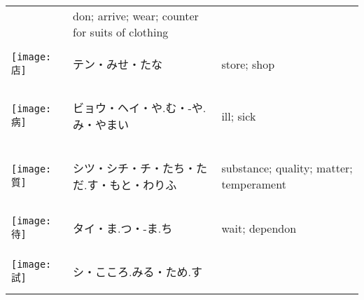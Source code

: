 \documentclass[a4paper,12pt]{extarticle}
\begin{document}
\begin{longtable}{|lp{6cm}p{4cm}|}
&
don; arrive; wear; counter for suits of clothing
\\ 
\begin{minipage}{0.3\textwidth}
\centerline{
	\texttt{[image: 店]}
}
\end{minipage}
&
\begin{CJK}{UTF8}{min}テン・みせ・たな\end{CJK}
&
store; shop
\\ 
\begin{minipage}{0.3\textwidth}
\centerline{
	\texttt{[image: 病]}
}
\end{minipage}
&
\begin{CJK}{UTF8}{min}ビョウ・ヘイ・や.む・-や.み・やまい\end{CJK}
&
ill; sick
\\ 
\begin{minipage}{0.3\textwidth}
\centerline{
	\texttt{[image: 質]}
}
\end{minipage}
&
\begin{CJK}{UTF8}{min}シツ・シチ・チ・たち・ただ.す・もと・わりふ\end{CJK}
&
substance; quality; matter; temperament
\\ 
\begin{minipage}{0.3\textwidth}
\centerline{
	\texttt{[image: 待]}
}
\end{minipage}
&
\begin{CJK}{UTF8}{min}タイ・ま.つ・-ま.ち\end{CJK}
&
wait; dependon
\\ 
\begin{minipage}{0.3\textwidth}
\centerline{
	\texttt{[image: 試]}
}
\end{minipage}
&
\begin{CJK}{UTF8}{min}シ・こころ.みる・ため.す\end{CJK}

\end{longtable}
\end{document}
